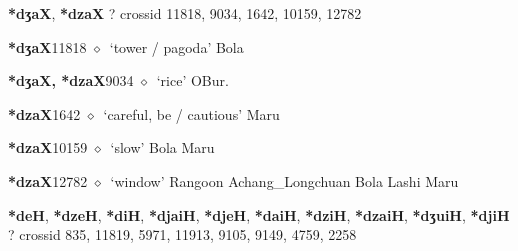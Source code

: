 \item
\textbf{*dʒaX}, \textbf{*dzaX}
?
  {\tiny crossid 11818, 9034, 1642, 10159, 12782}
  \begin{list}{}{\leftmargin=1.5em \itemindent=-1.5em}
  \item {\footnotesize \textbf{*dʒaX}}{\tiny 11818}
         $\diamond$~`tower / pagoda'
         Bola 
  \item {\footnotesize \textbf{*dʒaX, *dzaX}}{\tiny 9034}
\hspace{1ex}
         $\diamond$~`rice'
         OBur. 
  \item {\footnotesize \textbf{*dzaX}}{\tiny 1642}
\hspace{1ex}
         $\diamond$~`careful, be / cautious'
         Maru 
  \item {\footnotesize \textbf{*dzaX}}{\tiny 10159}
\hspace{1ex}
         $\diamond$~`slow'
         Bola 
\hspace{1ex}
         Maru 
  \item {\footnotesize \textbf{*dzaX}}{\tiny 12782}
\hspace{1ex}
         $\diamond$~`window'
         Rangoon 
\hspace{1ex}
         Achang\_Longchuan 
\hspace{1ex}
         Bola 
\hspace{1ex}
         Lashi 
\hspace{1ex}
         Maru 
  \end{list}
\item
\textbf{*deH}, \textbf{*dzeH}, \textbf{*diH}, \textbf{*djaiH}, \textbf{*djeH}, \textbf{*daiH}, \textbf{*dziH}, \textbf{*dzaiH}, \textbf{*dʒuiH}, \textbf{*djiH}
?
  {\tiny crossid 835, 11819, 5971, 11913, 9105, 9149, 4759, 2258}
